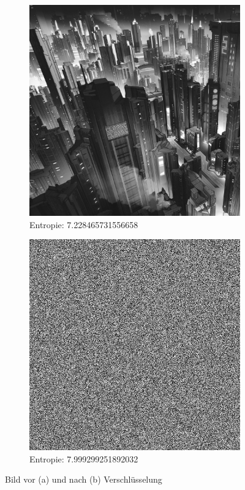 \begin{figure}
	\centering

	\begin{subfigure}{0.35\textwidth}
		\includegraphics[width=\textwidth]{../1/3/gray_7.228465731556658_city.jpg}
		\caption{Entropie: 7.228465731556658}
	\end{subfigure}
	\hfill
	\begin{subfigure}{0.35\textwidth}
		\includegraphics[width=\textwidth]{../1/3/encrypted_7.999299251892032_city.jpg}
		\caption{Entropie: 7.999299251892032}
	\end{subfigure}

	\caption{Bild vor (a) und nach (b) Verschlüsselung}
	\label{fig:city}
\end{figure}

